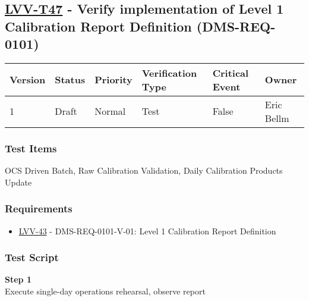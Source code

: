 \hypertarget{lvv-t47---verify-implementation-of-level-1-calibration-report-definition-dms-req-0101}{%
\subsection{\texorpdfstring{\href{https://jira.lsstcorp.org/secure/Tests.jspa\#/testCase/LVV-T47}{LVV-T47}
- Verify implementation of Level 1 Calibration Report Definition
(DMS-REQ-0101)}{LVV-T47 - Verify implementation of Level 1 Calibration Report Definition (DMS-REQ-0101)}}\label{lvv-t47---verify-implementation-of-level-1-calibration-report-definition-dms-req-0101}}

\begin{longtable}[]{@{}llllll@{}}
\toprule
Version & Status & Priority & Verification Type & Critical Event &
Owner\tabularnewline
\midrule
\endhead
1 & Draft & Normal & Test & False & Eric Bellm\tabularnewline
\bottomrule
\end{longtable}

\hypertarget{test-items-23}{%
\subsubsection{Test Items}\label{test-items-23}}

OCS Driven Batch, Raw Calibration Validation, Daily Calibration Products
Update

\hypertarget{requirements-24}{%
\subsubsection{Requirements}\label{requirements-24}}

\begin{itemize}
\tightlist
\item
  \href{https://jira.lsstcorp.org/browse/LVV-43}{LVV-43} -
  DMS-REQ-0101-V-01: Level 1 Calibration Report Definition
\end{itemize}

\hypertarget{test-script-24}{%
\subsubsection{Test Script}\label{test-script-24}}

\textbf{Step 1}\\
\hspace*{0.333em}Execute single-day operations rehearsal, observe
report\\
~\\

